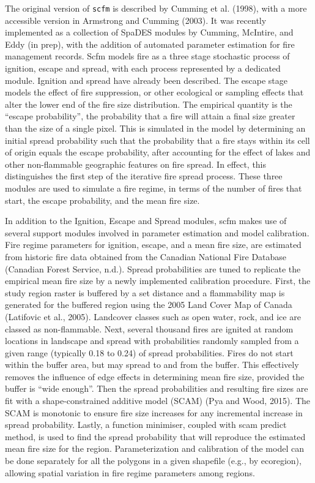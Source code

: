 \documentclass[]{article}
\begin{document}
The original version of \texttt{scfm} is described by Cumming et al.
(1998), with a more accessible version in Armstrong and Cumming (2003).
It was recently implemented as a collection of SpaDES modules by
Cumming, McIntire, and Eddy (in prep), with the addition of automated
parameter estimation for fire management records. Scfm models fire as a
three stage stochastic process of ignition, escape and spread, with each
process represented by a dedicated module. Ignition and spread have
already been described. The escape stage models the effect of fire
suppression, or other ecological or sampling effects that alter the
lower end of the fire size distribution. The empirical quantity is the
``escape probability'', the probability that a fire will attain a final
size greater than the size of a single pixel. This is simulated in the
model by determining an initial spread probability such that the
probability that a fire stays within its cell of origin equals the
escape probability, after accounting for the effect of lakes and other
non-flammable geographic features on fire spread. In effect, this
distinguishes the first step of the iterative fire spread process. These
three modules are used to simulate a fire regime, in terms of the number
of fires that start, the escape probability, and the mean fire size.

In addition to the Ignition, Escape and Spread modules, scfm makes use
of several support modules involved in parameter estimation and model
calibration. Fire regime parameters for ignition, escape, and a mean
fire size, are estimated from historic fire data obtained from the
Canadian National Fire Database (Canadian Forest Service, n.d.). Spread
probabilities are tuned to replicate the empirical mean fire size by a
newly implemented calibration procedure. First, the study region raster
is buffered by a set distance and a flammability map is generated for
the buffered region using the 2005 Land Cover Map of Canada (Latifovic
et al., 2005). Landcover classes such as open water, rock, and ice are
classed as non-flammable. Next, several thousand fires are ignited at
random locations in landscape and spread with probabilities randomly
sampled from a given range (typically 0.18 to 0.24) of spread
probabilities. Fires do not start within the buffer area, but may spread
to and from the buffer. This effectively removes the influence of edge
effects in determining mean fire size, provided the buffer is ``wide
enough''. Then the spread probabilities and resulting fire sizes are fit
with a shape-constrained additive model (SCAM) (Pya and Wood, 2015). The
SCAM is monotonic to ensure fire size increases for any incremental
increase in spread probability. Lastly, a function minimiser, coupled
with scam predict method, is used to find the spread probability that
will reproduce the estimated mean fire size for the region.
Parameterization and calibration of the model can be done separately for
all the polygons in a given shapefile (e.g., by ecoregion), allowing
spatial variation in fire regime parameters among regions.
\end{document}

